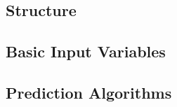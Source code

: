 \subsection{Structure}

\subsection{Basic Input Variables}
\subsection{Prediction Algorithms}
\subsection{}